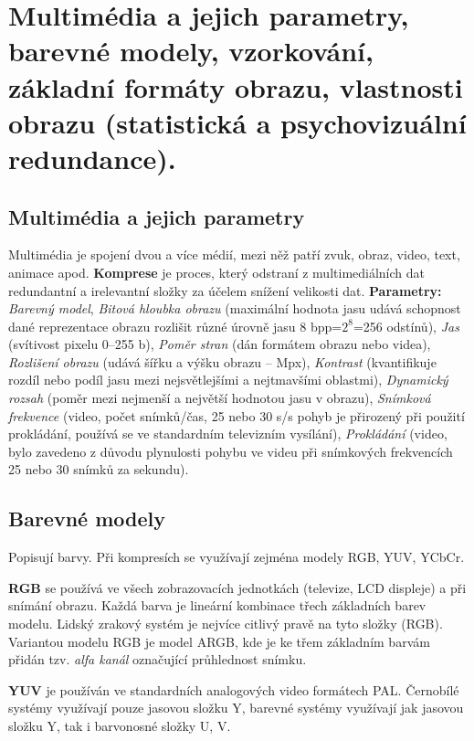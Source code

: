 \section{Multimédia a jejich parametry, barevné modely, vzorkování, základní formáty obrazu, vlastnosti obrazu (statistická a psychovizuální redundance).}

\subsection{Multimédia a jejich parametry}

Multimédia je spojení dvou a více médií, mezi něž patří zvuk, obraz, video, text, animace apod. \textbf{Komprese} je proces, který odstraní z multimediálních dat redundantní a irelevantní složky za účelem snížení velikosti dat. \textbf{Parametry:} \textit{Barevný model}, \textit{Bitová hloubka obrazu} (maximální hodnota jasu udává schopnost dané reprezentace obrazu rozlišit různé úrovně jasu 8 bpp=$2^8$=256 odstínů), \textit{Jas} (svítivost pixelu 0--255 b), \textit{Poměr stran} (dán formátem obrazu nebo videa), \textit{Rozlišení obrazu} (udává šířku a výšku obrazu -- Mpx), \textit{Kontrast} (kvantifikuje rozdíl nebo podíl jasu mezi nejsvětlejšími a nejtmavšími oblastmi), \textit{Dynamický rozsah} (poměr mezi nejmenší a největší hodnotou jasu v obrazu), \textit{Snímková frekvence} (video, počet snímků/čas, 25 nebo 30 s/s pohyb je přirozený při použití prokládání, používá se ve standardním televizním vysílání), \textit{Prokládání} (video, bylo zavedeno z důvodu plynulosti pohybu ve videu při snímkových frekvencích 25 nebo 30 snímků za sekundu).

\subsection{Barevné modely}

Popisují barvy. Při kompresích se využívají zejména modely RGB, YUV, YCbCr.

\textbf{RGB} se používá  ve všech zobrazovacích jednotkách (televize, LCD displeje) a při snímání obrazu. Každá barva je lineární kombinace třech základních barev modelu. Lidský zrakový systém je nejvíce citlivý pravě na tyto složky (RGB). Variantou modelu RGB je model ARGB, kde je ke třem základním barvám přidán tzv. \textit{alfa kanál} označující průhlednost snímku.

\textbf{YUV} je používán ve standardních analogových video formátech PAL. Černobílé systémy
využívají pouze jasovou složku Y, barevné systémy využívají jak jasovou složku Y, tak i barvonosné složky U, V.

